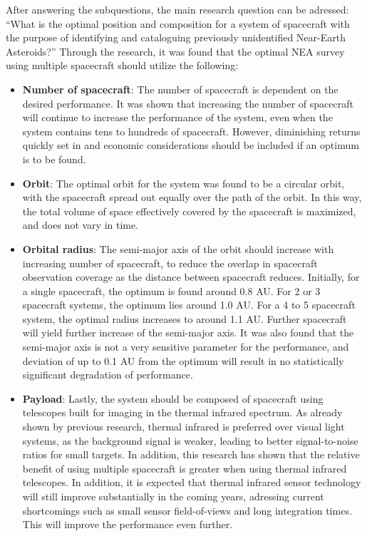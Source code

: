 After answering the subquestions, the main research question can be adressed: ``What is the optimal position and composition for a system of spacecraft with the purpose of identifying and cataloguing previously unidentified Near-Earth Asteroids?'' Through the research, it was found that the optimal NEA survey using multiple spacecraft should utilize the following:
\begin{itemize}
 \item \textbf{Number of spacecraft}: The number of spacecraft is dependent on the desired performance. It was shown that increasing the number of spacecraft will continue to increase the performance of the system, even when the system contains tens to hundreds of spacecraft. However, diminishing returns quickly set in and economic considerations should be included if an optimum is to be found.
 \item \textbf{Orbit}: The optimal orbit for the system was found to be a circular orbit, with the spacecraft spread out equally over the path of the orbit. In this way, the total volume of space effectively covered by the spacecraft is maximized, and does not vary in time.
 \item \textbf{Orbital radius}: The semi-major axis of the orbit should increase with increasing number of spacecraft, to reduce the overlap in spacecraft observation coverage as the distance between spacecraft reduces. Initially, for a single spacecraft, the optimum is found around 0.8 AU. For 2 or 3 spacecraft systems, the optimum lies around 1.0 AU. For a 4 to 5 spacecraft system, the optimal radius increases to around 1.1 AU. Further spacecraft will yield further increase of the semi-major axis. It was also found that the semi-major axis is not a very sensitive parameter for the performance, and deviation of up to 0.1 AU from the optimum will result in no statistically significant degradation of performance.
 \item \textbf{Payload}: Lastly, the system should be composed of spacecraft using telescopes built for imaging in the thermal infrared spectrum. As already shown by previous research, thermal infrared is preferred over visual light systems, as the background signal is weaker, leading to better signal-to-noise ratios for small targets. In addition, this research has shown that the relative benefit of using multiple spacecraft is greater when using thermal infrared telescopes. In addition, it is expected that thermal infrared sensor technology will still improve substantially in the coming years, adressing current shortcomings such as small sensor field-of-views and long integration times. This will improve the performance even further.
\end{itemize}

